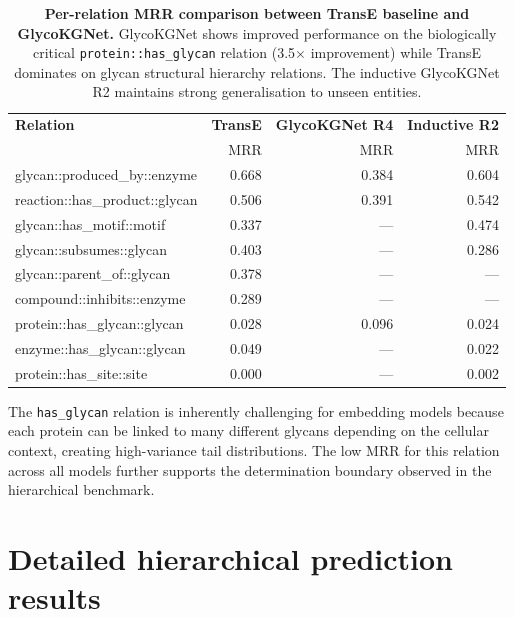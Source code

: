 \documentclass[11pt,a4paper]{article}
\begin{document}
\begin{table}[H]
\centering
\caption{\textbf{Per-relation MRR comparison between TransE baseline and
GlycoKGNet.} GlycoKGNet shows improved performance on the biologically
critical \texttt{protein::has\_glycan} relation (3.5$\times$ improvement) while
TransE dominates on glycan structural hierarchy relations. The inductive
GlycoKGNet R2 maintains strong generalisation to unseen entities.}
\label{tab:per_relation}
\small
\begin{tabular}{lrrr}
\toprule
\textbf{Relation} & \textbf{TransE} & \textbf{GlycoKGNet R4} & \textbf{Inductive R2} \\
 & MRR & MRR & MRR \\
\midrule
glycan::produced\_by::enzyme        & 0.668 & 0.384 & 0.604 \\
reaction::has\_product::glycan      & 0.506 & 0.391 & 0.542 \\
glycan::has\_motif::motif           & 0.337 & ---   & 0.474 \\
glycan::subsumes::glycan            & 0.403 & ---   & 0.286 \\
glycan::parent\_of::glycan          & 0.378 & ---   & --- \\
compound::inhibits::enzyme          & 0.289 & ---   & --- \\
\midrule
protein::has\_glycan::glycan        & 0.028 & 0.096 & 0.024 \\
enzyme::has\_glycan::glycan         & 0.049 & ---   & 0.022 \\
protein::has\_site::site            & 0.000 & ---   & 0.002 \\
\bottomrule
\end{tabular}
\end{table}

The \texttt{has\_glycan} relation is inherently challenging for embedding models
because each protein can be linked to many different glycans depending on the
cellular context, creating high-variance tail distributions. The low MRR for
this relation across all models further supports the determination boundary
observed in the hierarchical benchmark.

\section{Detailed hierarchical prediction results}
\label{sec:detailed_results}
\end{document}
